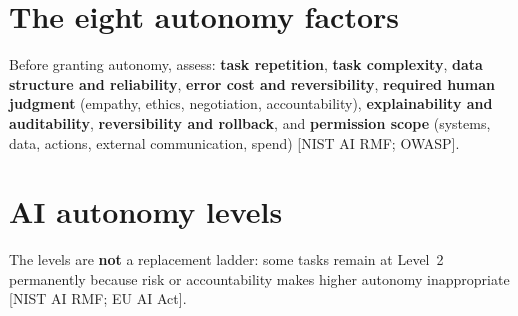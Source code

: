 \section{The eight autonomy factors}

Before granting autonomy, assess: \textbf{task repetition}, \textbf{task
complexity}, \textbf{data structure and reliability}, \textbf{error cost and
reversibility}, \textbf{required human judgment} (empathy, ethics,
negotiation, accountability), \textbf{explainability and auditability},
\textbf{reversibility and rollback}, and \textbf{permission scope} (systems,
data, actions, external communication, spend) [NIST AI RMF; OWASP].

\section{AI autonomy levels}

\begin{center}
\end{center}

The levels are \textbf{not} a replacement ladder: some tasks remain at
Level~2 permanently because risk or accountability makes higher autonomy
inappropriate [NIST AI RMF; EU AI Act].
